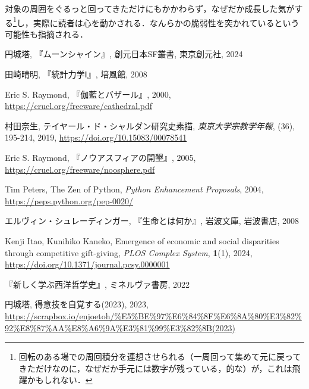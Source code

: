 \documentclass[10pt, a5paper, twoside]{jsarticle}
\theoremstyle{definition}
\begin{document}
			対象の周囲をぐるっと回ってきただけにもかかわらず，なぜだか成長した気がする\footnote{回転のある場での周回積分を連想させられる（一周回って集めて元に戻ってきただけなのに，なぜだか手元には数字が残っている，的な）が，これは飛躍かもしれない．}し，実際に読者は心を動かされる．なんらかの脆弱性を突かれているという可能性も指摘される．

	\newpage

	\begin{thebibliography}{99}

		 円城塔, 『ムーンシャイン』, 創元日本SF叢書, 東京創元社, 2024

		 田崎晴明, 『統計力学Ⅰ』, 培風館, 2008

		 Eric S. Raymond, 『伽藍とバザール』, 2000, \url{https://cruel.org/freeware/cathedral.pdf}

		 村田奈生, テイヤール・ド・シャルダン研究史素描, \textit{東京大学宗教学年報}, (36), 195-214, 2019, \url{https://doi.org/10.15083/00078541}


		 Eric S. Raymond, 『ノウアスフィアの開墾』, 2005, \url{https://cruel.org/freeware/noosphere.pdf}

		 Tim Peters, The Zen of Python, \textit{Python Enhancement Proposals}, 2004, \url{https://peps.python.org/pep-0020/}

		 エルヴィン・シュレーディンガー, 『生命とは何か』, 岩波文庫, 岩波書店, 2008

		 Kenji Itao, Kunihiko Kaneko, Emergence of economic and social disparities through competitive gift-giving, \textit{PLOS Complex System}, \textbf{1}(1), 2024, \url{https://doi.org/10.1371/journal.pcsy.0000001}

		 『新しく学ぶ西洋哲学史』, ミネルヴァ書房, 2022

		 円城塔, 得意技を自覚する(2023), 2023, \url{https://scrapbox.io/enjoetoh/%E5%BE%97%E6%84%8F%E6%8A%80%E3%82%92%E8%87%AA%E8%A6%9A%E3%81%99%E3%82%8B(2023)}

	\end{thebibliography}
\end{document}
